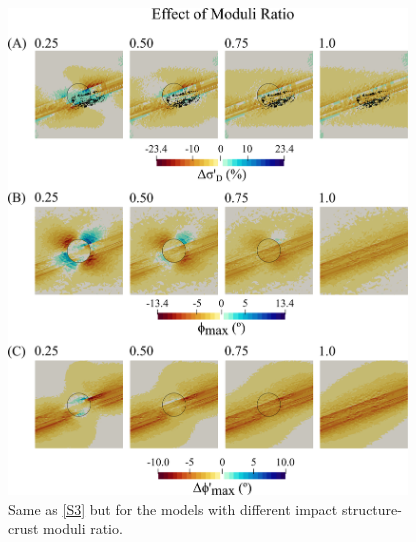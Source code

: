 \documentclass[draft,jgrga]{agutexSI2019}
\begin{document}
\begin{article}
\begin{figure}
\includegraphics[width=25pc]{Figures/effect_of_moduli_ratio.png}
\caption{Same as \ref{S3} but for the models with different impact structure-crust moduli ratio.}
\label{S6}
\end{figure}

\vspace{10mm} %























\end{article}
\end{document}
